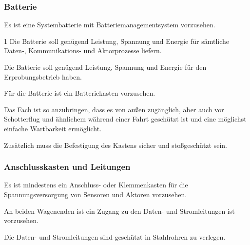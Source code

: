 \subsubsection{Batterie}
\begin{feat}
Es ist eine \gls{Systembatterie} mit Batteriemanagementsystem vorzusehen.
\end{feat}
\begin{rem}[zu Anf. 10]1
Die Batterie soll genügend Leistung, Spannung und Energie für sämtliche Daten-, Kommunikations- und Aktorprozesse liefern.
\end{rem}
\begin{rem}[zu Anf. 11]
Die Batterie soll genügend Leistung, Spannung und Energie für den Erprobungsbetrieb haben.
\end{rem}
\begin{feat}
Für die Batterie ist ein Batteriekasten vorzusehen. 
\end{feat}
\begin{rem} [zu Anf. 12]
Das Fach ist so anzubringen, dass es von außen zugänglich, aber auch vor Schotterflug und ähnlichem während einer Fahrt geschützt ist und eine möglichst einfache Wartbarkeit ermöglicht.
\end{rem}
\begin{rem} [zu Anf. 12]
Zusätzlich muss die Befestigung des Kastens sicher und stoßgeschützt sein.
\end{rem}

\subsubsection{Anschlusskasten und Leitungen}
\begin{feat}
Es ist mindestens ein Anschluss- oder Klemmenkasten für die Spannungsversorgung von Sensoren und Aktoren vorzusehen. 
\end{feat}
\begin{feat}
An beiden Wagenenden ist ein Zugang zu den Daten- und Stromleitungen ist vorzusehen.
\end{feat}
\begin{feat}
Die Daten- und Stromleitungen sind geschützt in Stahlrohren zu verlegen.
\end{feat}

